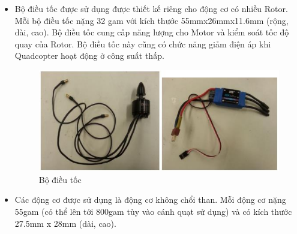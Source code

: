\begin{itemize}
\item Bộ điều tốc được sử dụng được thiết kế riêng cho động cơ có nhiều Rotor. Mỗi bộ điều tốc nặng 32 gam với kích thước 55mmx26mmx11.6mm (rộng, dài, cao). Bộ điều tốc cung cấp năng lượng cho Motor và kiểm soát tốc độ quay của Rotor. Bộ điều tốc này cũng có chức năng giảm điện áp khi Quadcopter hoạt động ở công suất thấp.
\begin{figure}[h!]
	        	\begin{center}
	        		\includegraphics[scale=0.8]{images/Cuong-ESC.png}
	        		\caption{Bộ điều tốc}
	        	\end{center}
        \end{figure}
\item Các động cơ được sử dụng là động cơ không chổi than. Mỗi động cơ nặng 55gam (có thể lên tới 800gam tùy vào cánh quạt sử dụng) và có kích thước 27.5mm x 28mm (dài, cao).


\end{itemize}
